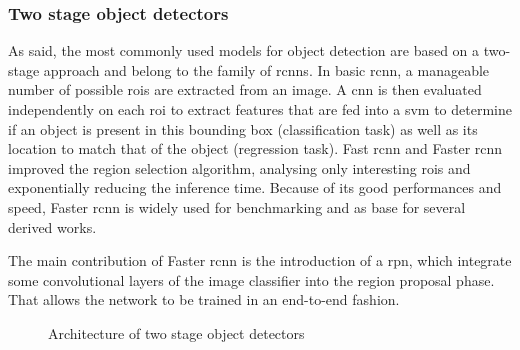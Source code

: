 \documentclass[%
    corpo=12pt,
    twoside,
    stile=classica,   
    tipotesi=magistrale,
    evenboxes,
    english,
	numerazioneromana,
]{toptesi}
\begin{document}
\subsubsection{Two stage object detectors}
As said, the most commonly used models for object detection are based on a two-stage approach and belong to the family of \glspl{rcnn}. In basic \acrshort{rcnn}\cite{girshick2014rich}, a manageable number of possible \glspl{roi} are extracted from an image. A \gls{cnn} is then evaluated independently on each \acrshort{roi} to extract features that are fed into a \gls{svm}
to determine if an object is present in this bounding box (classification task) as well as its location to match that of the object (regression task).
Fast \acrshort{rcnn}\cite{girshick2015fast} and Faster \acrshort{rcnn}\cite{ren2016faster} improved the region selection algorithm, analysing only interesting \glspl{roi} and exponentially reducing the inference time. Because of its good performances and speed, Faster \acrshort{rcnn} is widely used for benchmarking and as base for several derived works.


The main contribution of Faster \acrshort{rcnn} is the introduction of a \gls{rpn}, which integrate some convolutional layers of the image classifier into the region proposal phase. That allows the network to be trained in an end-to-end fashion.

\begin{figure}[ht]
	\centering
	\caption{Architecture of two stage object detectors}
	\label{fig:architectures}
\end{figure}
\end{document}
